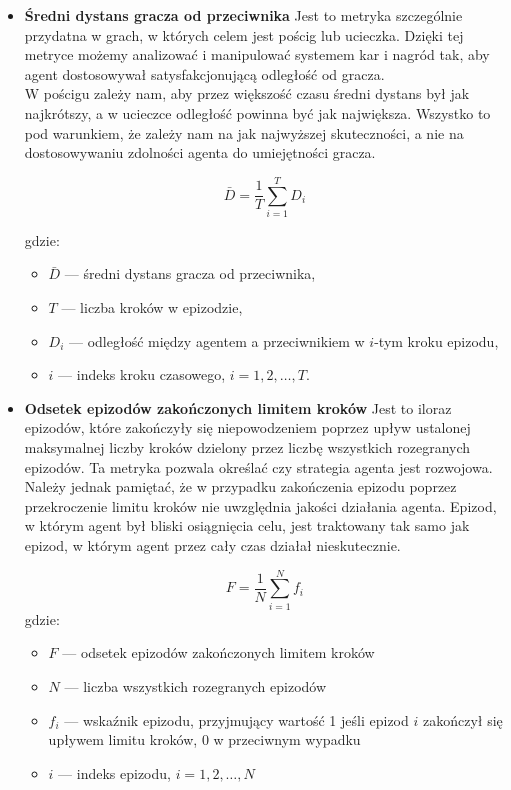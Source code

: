 \documentclass{iiuwb}
\begin{document}
\begin{itemize}
\item \textbf{Średni dystans gracza od przeciwnika}
Jest to metryka szczególnie przydatna w grach, w których celem jest pościg lub ucieczka. Dzięki tej metryce możemy analizować i manipulować systemem kar i nagród tak, aby agent dostosowywał satysfakcjonującą odległość od gracza.\\ 
W pościgu zależy nam, aby przez większość czasu średni dystans był jak najkrótszy, a w ucieczce odległość powinna być jak największa. Wszystko to pod warunkiem, że zależy nam na jak najwyższej skuteczności, a nie na dostosowywaniu zdolności agenta do umiejętności gracza.

\begin{equation}
\bar{D} = \frac{1}{T} \sum_{i=1}^{T} D_i
\end{equation}

\noindent
gdzie:
\begin{itemize}
    \item $\bar{D}$ — średni dystans gracza od przeciwnika,
    \item $T$ — liczba kroków w epizodzie,
    \item $D_i$ — odległość między agentem a przeciwnikiem w $i$-tym kroku epizodu,
    \item $i$ — indeks kroku czasowego, $i = 1,2,\dots,T$.
\end{itemize}
\item \textbf{Odsetek epizodów zakończonych limitem kroków}
Jest to iloraz epizodów, które zakończyły się niepowodzeniem poprzez upływ ustalonej maksymalnej liczby kroków dzielony przez liczbę wszystkich rozegranych epizodów. Ta metryka pozwala określać czy strategia agenta jest rozwojowa. Należy jednak pamiętać, że w przypadku zakończenia epizodu poprzez przekroczenie limitu kroków nie uwzględnia jakości działania agenta. Epizod, w którym agent był bliski osiągnięcia celu, jest traktowany tak samo jak epizod, w którym agent przez cały czas działał nieskutecznie.

\begin{equation}
F = \frac{1}{N} \sum_{i=1}^{N} f_i
\end{equation}
gdzie:
\begin{itemize}
    \item $F$ — odsetek epizodów zakończonych limitem kroków
    \item $N$ — liczba wszystkich rozegranych epizodów
    \item $f_i$ — wskaźnik epizodu, przyjmujący wartość 1 jeśli epizod $i$ zakończył się upływem limitu kroków, 0 w przeciwnym wypadku
    \item $i$ — indeks epizodu, $i = 1,2,\dots,N$
\end{itemize}


\end{itemize}
\end{document}
